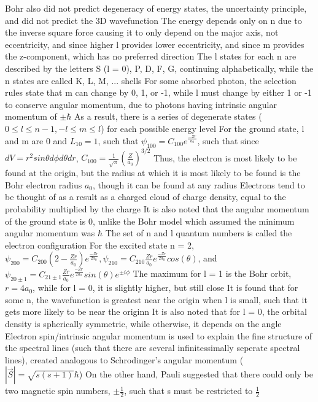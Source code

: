 \documentclass[11 pt, twoside]{article}
\newenvironment{outline*}
{
	\begin{outline}[enumerate]
	}
	{\end{outline}
}
\begin{document}
\begin{outline*}
		\3 Bohr also did not predict degeneracy of energy states, the uncertainty principle, and did not predict the 3D wavefunction
	\2 The energy depends only on n due to the inverse square force causing it to only depend on the major axis, not eccentricity, and since higher l provides lower eccentricity, and since m provides the z-component, which has no preferred direction
		\3 The l states for each n are described by the letters S (l = 0), P, D, F, G, continuing alphabetically, while the n states are called K, L, M, ... shells
		\3 For some absorbed photon, the selection rules state that m can change by 0, 1, or -1, while l must change by either 1 or -1 to conserve angular momentum, due to photons having intrinsic angular momentum of $\pm \hbar$
		\3 As a result, there is a series of degenerate states ($0 \leq l \leq n -1, -l \leq m \leq l$) for each possible energy level
	\2 For the ground state, l and m are 0 and $L_{10} = 1$, such that $\psi_{100} = C_100e^{\frac{-Zr}{a_0}}$, such that since $dV = r^2sin\theta d\phi d\theta dr$, $C_100 = \frac{1}{\sqrt{\pi}}(\frac{Z}{a_0})^{3/2}$
		\3 Thus, the electron is most likely to be found at the origin, but the radius at which it is most likely to be found is the Bohr electron radius $a_0$, though it can be found at any radius
		\3 Electrons tend to be thought of as a result as a charged cloud of charge density, equal to the probability multiplied by the charge
		\3 It is also noted that the angular momentum of the ground state is 0, unlike the Bohr model which assumed the minimum angular momentum was $\hbar$
		\3 The set of n and l quantum numbers is called the electron configuration
	\2 For the excited state n = 2, $\psi_{200} = C_{200}(2 - \frac{Zr}{a_0})e^{\frac{-Zr}{2a_0}}, \psi_{210} = C_{210}\frac{Zr}{a_0}e^{\frac{-Zr}{2a_0}}cos(\theta)$, and $\psi_{20\pm 1} = C_{21 \pm 1}\frac{Zr}{a_0}e^{\frac{-Zr}{2a_0}}sin(\theta)e^{\pm i\phi}$
		\3 The maximum for l = 1 is the Bohr orbit, $r = 4a_0$, while for l = 0, it is slightly higher, but still close
		\3 It is found that for some n, the wavefunction is greatest near the origin when l is small, such that it gets more likely to be near the originn
		\3 It is also noted that for l = 0, the orbital density is spherically symmetric, while otherwise, it depends on the angle
\1 Electron spin/intrinsic angular momentum is used to explain the fine structure of the spectral lines (such that there are several infinitessimally seperate spectral lines), created analogous to Schrodinger's angular momentum ($|\vec{S}| = \sqrt{s(s + 1)}\hbar$)
	\2 On the other hand, Pauli suggested that there could only be two magnetic spin numbers, $\pm \frac{1}{2}$, such that s must be restricted to $\frac{1}{2}$

\end{outline*}
\end{document}
